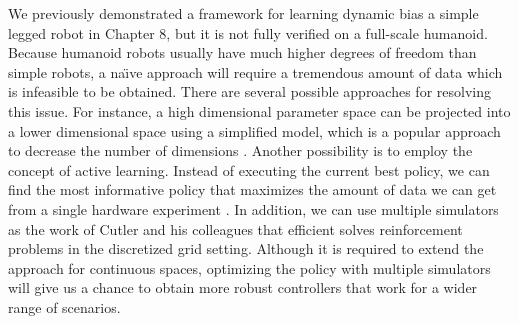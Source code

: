 We previously demonstrated a framework for learning dynamic bias
a simple legged robot in Chapter 8, but it is not fully verified on a
full-scale humanoid.
Because humanoid robots usually have much higher degrees of freedom than simple
robots, 
a na\"{\i}ve approach will require
a tremendous amount of data which is infeasible to be obtained.
There are several possible approaches for resolving this issue.
For instance, a high dimensional parameter space can be projected into a lower
dimensional space using a simplified model, which is a popular approach to
decrease the number of dimensions \cite{bib-humanoid13-trajectory}.
Another possibility is to employ the concept of active learning.
Instead of executing the current best policy, we can find the most
informative policy that maximizes the amount of data we can get from a
single hardware experiment \cite{DaSilva:2014:ACP}.
In addition, we can use multiple simulators as the work of Cutler and his
colleagues \cite{bib-icra14-reinforcement} that efficient solves reinforcement
problems in the discretized grid setting. 
Although it is required to extend the approach for continuous spaces,
optimizing the policy with multiple simulators will give us a chance to obtain
more robust controllers that work for a wider range of scenarios.














